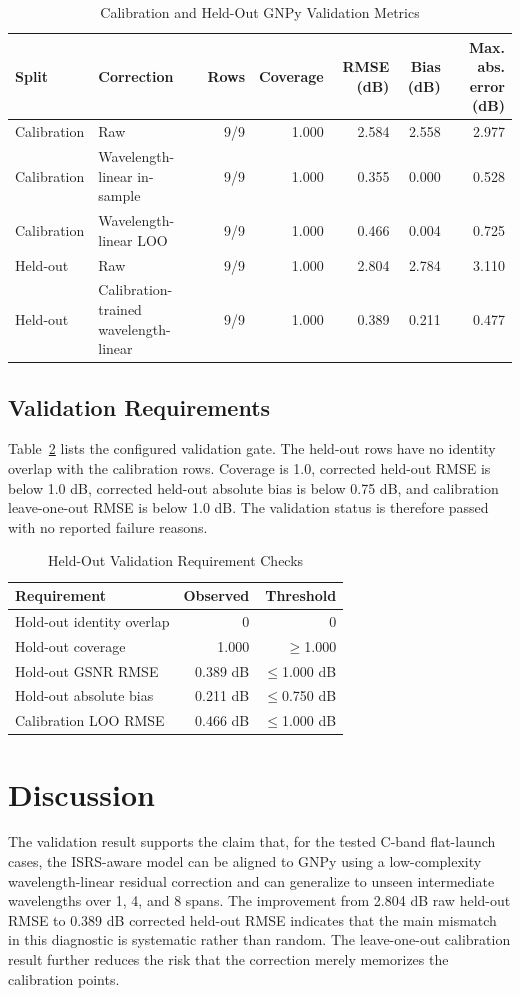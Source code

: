 \documentclass[conference]{IEEEtran}
\begin{document}
\begin{table}[!t]
\caption{Calibration and Held-Out GNPy Validation Metrics}
\label{tab:summary}
\centering
\begin{tabular}{llrrrrr}
\toprule
Split & Correction & Rows & Coverage & RMSE (dB) & Bias (dB) & Max. abs. error (dB) \\
\midrule
Calibration & Raw & 9/9 & 1.000 & 2.584 & 2.558 & 2.977 \\
Calibration & Wavelength-linear in-sample & 9/9 & 1.000 & 0.355 & 0.000 & 0.528 \\
Calibration & Wavelength-linear LOO & 9/9 & 1.000 & 0.466 & 0.004 & 0.725 \\
Held-out & Raw & 9/9 & 1.000 & 2.804 & 2.784 & 3.110 \\
Held-out & Calibration-trained wavelength-linear & 9/9 & 1.000 & 0.389 & 0.211 & 0.477 \\
\bottomrule
\end{tabular}
\end{table}

\subsection{Validation Requirements}
Table~\ref{tab:requirements} lists the configured validation gate. The held-out rows have no identity overlap with the calibration rows. Coverage is 1.0, corrected held-out RMSE is below 1.0 dB, corrected held-out absolute bias is below 0.75 dB, and calibration leave-one-out RMSE is below 1.0 dB. The validation status is therefore passed with no reported failure reasons.

\begin{table}[!t]
\caption{Held-Out Validation Requirement Checks}
\label{tab:requirements}
\centering
\begin{tabular}{lrr}
\toprule
Requirement & Observed & Threshold \\
\midrule
Hold-out identity overlap & 0 & 0 \\
Hold-out coverage & 1.000 & $\geq$1.000 \\
Hold-out GSNR RMSE & 0.389 dB & $\leq$1.000 dB \\
Hold-out absolute bias & 0.211 dB & $\leq$0.750 dB \\
Calibration LOO RMSE & 0.466 dB & $\leq$1.000 dB \\
\bottomrule
\end{tabular}
\end{table}

\section{Discussion}
The validation result supports the claim that, for the tested C-band flat-launch cases, the ISRS-aware model can be aligned to GNPy using a low-complexity wavelength-linear residual correction and can generalize to unseen intermediate wavelengths over 1, 4, and 8 spans. The improvement from 2.804 dB raw held-out RMSE to 0.389 dB corrected held-out RMSE indicates that the main mismatch in this diagnostic is systematic rather than random. The leave-one-out calibration result further reduces the risk that the correction merely memorizes the calibration points.
\end{document}
